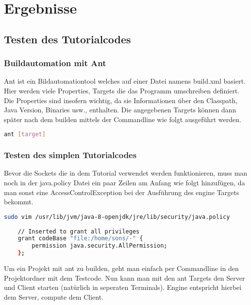 
\section{Ergebnisse}
\label{sec:Ergebnisse}
	
\subsection{Testen des Tutorialcodes}

\subsubsection{Buildautomation mit Ant}

Ant ist ein Bildautomationtool welches auf einer Datei namens build.xml
basiert. Hier werden viele Properties, Targets die das Programm umschreiben definiert. Die Properties sind insofern wichtig, da sie Informationen über den Classpath, Java Version, Binaries usw., enthalten.
Die angegebenen Targets können dann später nach dem builden mittels der Commandline wie folgt ausgeführt werden.

\begin{lstlisting}[caption=Ant Beispiel, language=bash]
	ant [target]
\end{lstlisting}

\subsubsection{Testen des simplen Tutorialcodes}

Bevor die Sockets die in dem Tutorial verwendet werden
funktionieren, muss man noch in der java.policy Datei ein paar Zeilen am Anfang wie folgt hinzufügen, da man sonst eine AccessControlException bei der Ausführung des engine Targets bekommt.

\begin{lstlisting}[caption=Bearbeiten von java.policy, language=bash]
	sudo vim /usr/lib/jvm/java-8-openjdk/jre/lib/security/java.policy
	
	// Inserted to grant all privileges
	grant codeBase "file:/home/sons/-" {
       	permission java.security.AllPermission;
	};
\end{lstlisting}

Um ein Projekt mit ant zu builden, geht man einfach per Commandline in den Projektordner mit dem Testcode.
Nun kann man mit den ant Targets den Server und Client starten (natürlich in seperaten Terminals). Engine entspricht hierbei dem Server, compute dem Client.

